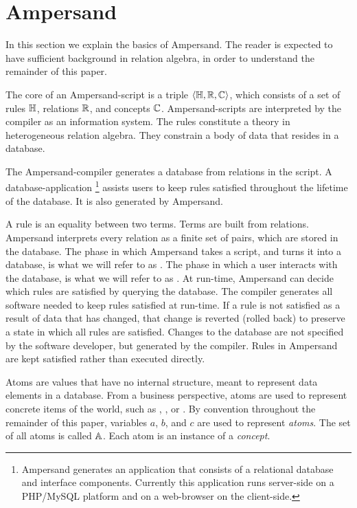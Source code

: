 \documentclass{svproc}
\begin{document}
\section{Ampersand}
\label{sct:Ampersand}
	In this section we explain the basics of Ampersand.
	The reader is expected to have sufficient background in relation algebra,
	in order to understand the remainder of this paper.

	The core of an Ampersand-script is a triple $\langle\mathbb{H},\mathbb{R},\mathbb{C}\rangle$,
	which consists of a set of rules $\mathbb{H}$, relations $\mathbb{R}$, and concepts $\mathbb{C}$.
	Ampersand-scripts are interpreted by the compiler as an information system.
	The rules constitute a theory in heterogeneous relation algebra.
	They constrain a body of data that resides in a database.

	The Ampersand-compiler generates a database from relations in the script.
	A database-application%
\footnote{Ampersand generates an application that consists of a relational database and interface components.
	Currently this application runs server-side on a PHP/MySQL platform and on a web-browser on the client-side.}
	assists users to keep rules satisfied throughout the lifetime of the database. It is also generated by Ampersand.

	A rule is an equality between two terms.
	Terms are built from relations.
	Ampersand interprets every relation as a finite set of pairs, which are stored in the database.
	The phase in which Ampersand takes a script, and turns it into a database, is what we will refer to as .
	The phase in which a user interacts with the database, is what we will refer to as .
	At run-time, Ampersand can decide which rules are satisfied by querying the database.
	The compiler generates all software needed to keep rules satisfied at run-time.
	If a rule is not satisfied as a result of data that has changed, that change is reverted (rolled back) to
	preserve a state in which all rules are satisfied.
	Changes to the database are not specified by the software developer, but generated by the compiler.
	Rules in Ampersand are kept satisfied rather than executed directly.
	
	Atoms are values that have no internal structure, meant to represent data elements in a database.
	From a business perspective, atoms are used to represent concrete items of the world,
	such as , , or .
	By convention throughout the remainder of this paper, variables $a$, $b$, and $c$ are used to represent \emph{atoms}.
	The set of all atoms is called $\mathbb{A}$.
        Each atom is an instance of a \emph{concept}.
\end{document}
